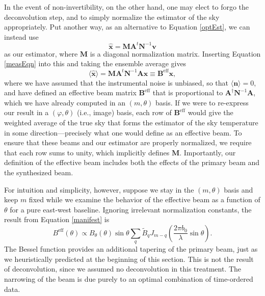 \documentclass[twocolumn,numberedappendix]{emulateapj}
\newcommand{\vis}{\mathbf{v}}
\newcommand{\x}{\mathbf{x}}
\newcommand{\A}{\mathbf{A}}
\newcommand{\N}{\mathbf{N}}
\begin{document}
In the event of non-invertibility, on the other hand, one may elect to forgo the deconvolution step, and to simply normalize the estimator of the sky appropriately.  Put another way, as an alternative to Equation \eqref{optEst}, we can instead use
\begin{equation}
\hat{\x} = \mathbf{M} \A^t \N^{-1} \vis
\end{equation}
as our estimator, where $\mathbf{M}$ is a diagonal normalization matrix.  Inserting Equation \eqref{measEqn} into this and taking the ensemble average gives
\begin{equation}
\langle \hat{\x} \rangle = \mathbf{M} \A^t \N^{-1} \A \x \equiv \mathbf{B}^\textrm{eff} \x,
\end{equation}
where we have assumed that the instrumental noise is unbiased, so that $\langle \mathbf{n} \rangle = 0$, and have defined an effective beam matrix $\mathbf{B}^\textrm{eff}$ that is proportional to $\A^\dagger \N^{-1} \A$, which we have already computed in an $(m, \theta)$ basis.  If we were to re-express our result in a $(\varphi, \theta)$ (i.e., image) basis, each row of $\mathbf{B}^\textrm{eff}$ would give the weighted average of the true sky that forms the estimator of the sky temperature in some direction---precisely what one would define as an effective beam.  To ensure that these beams and our estimator are properly normalized, we require that each row sums to unity, which implicitly defines $\mathbf{M}$.  Importantly, our definition of the effective beam includes both the effects of the primary beam and the synthesized beam.

For intuition and simplicity, however, suppose we stay in the $(m, \theta)$ basis and keep $m$ fixed while we examine the behavior of the effective beam as a function of $\theta$ for a pure east-west baseline.  Ignoring irrelevant normalization constants, the result from Equation \eqref{manifest} is
\begin{equation}
B^\textrm{eff} (\theta) \propto B_\theta (\theta) \sin \theta \sum_q \widetilde{B}_q  J_{m-q} \left( \frac{2 \pi b_0}{\lambda} \sin \theta \right).
\end{equation}
The Bessel function provides an additional tapering of the primary beam, just as we heuristically predicted at the beginning of this section.  This is not the result of deconvolution, since we assumed no deconvolution in this treatment.  The narrowing of the beam is due purely to an optimal combination of time-ordered data.
\end{document}
